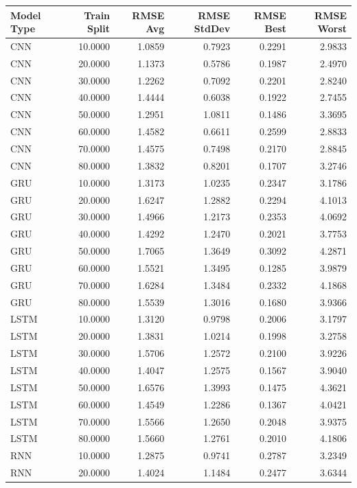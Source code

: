 \begin{tabular}{lrrrrr}
\toprule
Model Type & Train Split & RMSE Avg & RMSE StdDev & RMSE Best & RMSE Worst \\
\midrule
CNN & 10.0000 & 1.0859 & 0.7923 & 0.2291 & 2.9833 \\
CNN & 20.0000 & 1.1373 & 0.5786 & 0.1987 & 2.4970 \\
CNN & 30.0000 & 1.2262 & 0.7092 & 0.2201 & 2.8240 \\
CNN & 40.0000 & 1.4444 & 0.6038 & 0.1922 & 2.7455 \\
CNN & 50.0000 & 1.2951 & 1.0811 & 0.1486 & 3.3695 \\
CNN & 60.0000 & 1.4582 & 0.6611 & 0.2599 & 2.8833 \\
CNN & 70.0000 & 1.4575 & 0.7498 & 0.2170 & 2.8845 \\
CNN & 80.0000 & 1.3832 & 0.8201 & 0.1707 & 3.2746 \\
GRU & 10.0000 & 1.3173 & 1.0235 & 0.2347 & 3.1786 \\
GRU & 20.0000 & 1.6247 & 1.2882 & 0.2294 & 4.1013 \\
GRU & 30.0000 & 1.4966 & 1.2173 & 0.2353 & 4.0692 \\
GRU & 40.0000 & 1.4292 & 1.2470 & 0.2021 & 3.7753 \\
GRU & 50.0000 & 1.7065 & 1.3649 & 0.3092 & 4.2871 \\
GRU & 60.0000 & 1.5521 & 1.3495 & 0.1285 & 3.9879 \\
GRU & 70.0000 & 1.6284 & 1.3484 & 0.2332 & 4.1868 \\
GRU & 80.0000 & 1.5539 & 1.3016 & 0.1680 & 3.9366 \\
LSTM & 10.0000 & 1.3120 & 0.9798 & 0.2006 & 3.1797 \\
LSTM & 20.0000 & 1.3831 & 1.0214 & 0.1998 & 3.2758 \\
LSTM & 30.0000 & 1.5706 & 1.2572 & 0.2100 & 3.9226 \\
LSTM & 40.0000 & 1.4047 & 1.2575 & 0.1567 & 3.9040 \\
LSTM & 50.0000 & 1.6576 & 1.3993 & 0.1475 & 4.3621 \\
LSTM & 60.0000 & 1.4549 & 1.2286 & 0.1367 & 4.0421 \\
LSTM & 70.0000 & 1.5566 & 1.2650 & 0.2048 & 3.9375 \\
LSTM & 80.0000 & 1.5660 & 1.2761 & 0.2010 & 4.1806 \\
RNN & 10.0000 & 1.2875 & 0.9741 & 0.2787 & 3.2349 \\
RNN & 20.0000 & 1.4024 & 1.1484 & 0.2477 & 3.6344 \\

\end{tabular}
